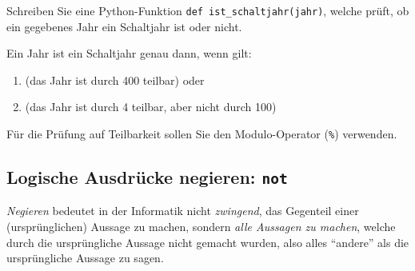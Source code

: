 \begin{mychallenge}
	Schreiben Sie eine Python-Funktion \lstinline|def ist_schaltjahr(jahr)|, welche prüft, ob ein gegebenes Jahr ein Schaltjahr ist oder nicht.

	Ein Jahr ist ein Schaltjahr genau dann, wenn gilt:
	\begin{enumerate}
		\item (das Jahr ist durch 400 teilbar) oder
		\item (das Jahr ist durch 4 teilbar, aber nicht durch 100)
	\end{enumerate}
	Für die Prüfung auf Teilbarkeit sollen Sie den Modulo-Operator (\lstinline|%|) verwenden.
	\begin{myanswer}
		
	\end{myanswer}
\end{mychallenge}

\subsection{Logische Ausdrücke negieren: \texorpdfstring{\lstinline|not|}{not}}
\textit{Negieren} bedeutet in der Informatik nicht \textit{zwingend}, das Gegenteil einer (ursprünglichen) Aussage zu machen, sondern \textit{alle Aussagen zu machen}, welche durch die ursprüngliche Aussage nicht gemacht wurden, also alles \enquote{andere} als die ursprüngliche Aussage zu sagen.

